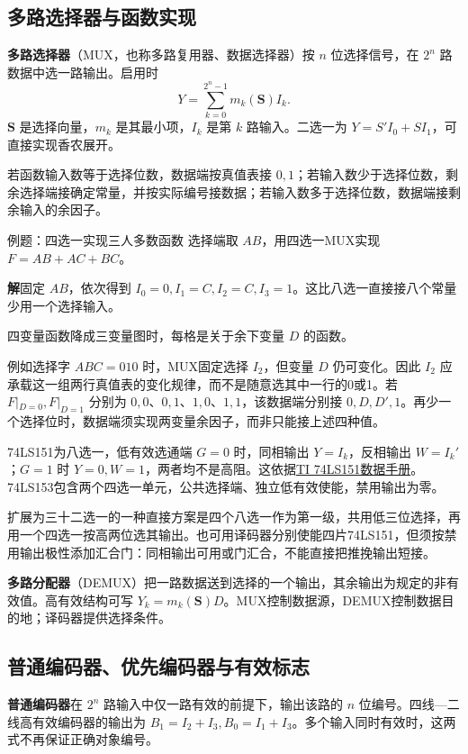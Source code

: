 \documentclass[UTF8,fontset=none,zihao=-4,a4paper]{ctexart}
\newcommand{\term}[1]{\textbf{#1}}
\newcommand{\sol}{\par\noindent\textbf{解}\quad}
\begin{document}
\subsection{多路选择器与函数实现}
\term{多路选择器}（MUX，也称多路复用器、数据选择器）按 $n$ 位选择信号，在 $2^n$ 路数据中选一路输出。启用时
\[
Y=\sum_{k=0}^{2^n-1}m_k(\symbf{S})I_k.
\]
$\symbf{S}$ 是选择向量，$m_k$ 是其最小项，$I_k$ 是第 $k$ 路输入。二选一为 $Y=S'I_0+SI_1$，可直接实现香农展开。

若函数输入数等于选择位数，数据端按真值表接 $0,1$；若输入数少于选择位数，剩余选择端接确定常量，并按实际编号接数据；若输入数多于选择位数，数据端接剩余输入的余因子。
\begin{infobox}{例题：四选一实现三人多数函数}
选择端取 $AB$，用四选一MUX实现 $F=AB+AC+BC$。
\end{infobox}
\sol 固定 $AB$，依次得到 $I_0=0,I_1=C,I_2=C,I_3=1$。这比八选一直接接八个常量少用一个选择输入。

四变量函数降成三变量图时，每格是关于余下变量 $D$ 的函数。

例如选择字 $ABC=010$ 时，MUX固定选择 $I_2$，但变量 $D$ 仍可变化。因此 $I_2$ 应承载这一组两行真值表的变化规律，而不是随意选其中一行的0或1。若 $F|_{D=0},F|_{D=1}$ 分别为 $0,0$、$0,1$、$1,0$、$1,1$，该数据端分别接 $0,D,D',1$。再少一个选择位时，数据端须实现两变量余因子，而非只能接上述四种值。

74LS151为八选一，低有效选通端 $G=0$ 时，同相输出 $Y=I_k$，反相输出 $W=I_k'$；$G=1$ 时 $Y=0,W=1$，两者均不是高阻。这依据\href{https://www.ti.com/lit/ds/symlink/sn74ls151.pdf}{TI 74LS151数据手册}。74LS153包含两个四选一单元，公共选择端、独立低有效使能，禁用输出为零。

扩展为三十二选一的一种直接方案是四个八选一作为第一级，共用低三位选择，再用一个四选一按高两位选其输出。也可用译码器分别使能四片74LS151，但须按禁用输出极性添加汇合门：同相输出可用或门汇合，不能直接把推挽输出短接。

\term{多路分配器}（DEMUX）把一路数据送到选择的一个输出，其余输出为规定的非有效值。高有效结构可写 $Y_k=m_k(\symbf S)D$。MUX控制数据源，DEMUX控制数据目的地；译码器提供选择条件。

\subsection{普通编码器、优先编码器与有效标志}
\term{普通编码器}在 $2^n$ 路输入中仅一路有效的前提下，输出该路的 $n$ 位编号。四线—二线高有效编码器的输出为 $B_1=I_2+I_3,B_0=I_1+I_3$。多个输入同时有效时，这两式不再保证正确对象编号。
\end{document}
